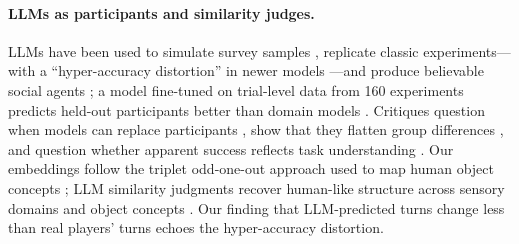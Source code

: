 \paragraph{LLMs as participants and similarity judges.} LLMs have been used to simulate survey samples \citep{argyle2023}, replicate classic experiments---with a ``hyper-accuracy distortion'' in newer models \citep{aher2023}---and produce believable social agents \citep{park2023}; a model fine-tuned on trial-level data from 160 experiments predicts held-out participants better than domain models \citep{binz2025}. Critiques question when models can replace participants \citep{dillion2023}, show that they flatten group differences \citep{wang2025}, and question whether apparent success reflects task understanding \citep[preprint]{liu2025}. Our embeddings follow the triplet odd-one-out approach used to map human object concepts \citep{hebart2020,muttenthaler2022}; LLM similarity judgments recover human-like structure across sensory domains \citep{marjieh2024} and object concepts \citep{du2025}. Our finding that LLM-predicted turns change less than real players' turns echoes the hyper-accuracy distortion.
